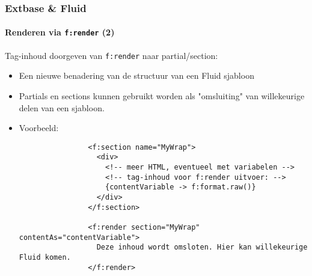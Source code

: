 
\begin{frame}[fragile]
	\frametitle{Extbase \& Fluid}
	\framesubtitle{Renderen via \texttt{f:render} (2)}

	\lstset{basicstyle=\tiny\ttfamily}

	Tag-inhoud doorgeven van \texttt{f:render} naar partial/section:

	\begin{itemize}

		\item Een nieuwe benadering van de structuur van een Fluid sjabloon

		\item Partials en sections kunnen gebruikt worden als "omsluiting" van willekeurige
			delen van een sjabloon.

		\item Voorbeeld:

			\begin{lstlisting}
				<f:section name="MyWrap">
				  <div>
				    <!-- meer HTML, eventueel met variabelen -->
				    <!-- tag-inhoud voor f:render uitvoer: -->
				    {contentVariable -> f:format.raw()}
				  </div>
				</f:section>

				<f:render section="MyWrap" contentAs="contentVariable">
				  Deze inhoud wordt omsloten. Hier kan willekeurige Fluid komen.
				</f:render>
			\end{lstlisting}

	\end{itemize}

\end{frame}



